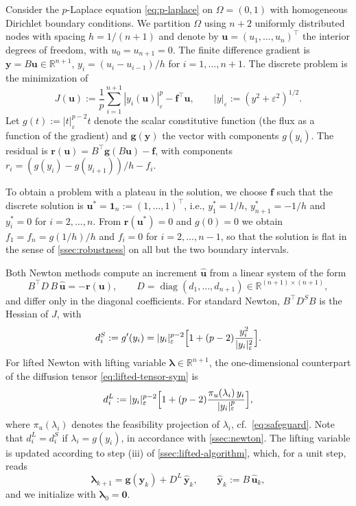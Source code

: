 \documentclass[11pt,pdflatex,sn-mathphys-num]{sn-jnl}
\theoremstyle{thmstyleone}%
\theoremstyle{thmstyletwo}%
\theoremstyle{thmstylethree}%
\newcommand{\bs}[1]{\ensuremath{\boldsymbol{#1}}}
\begin{document}
Consider the $p$-Laplace equation \eqref{eq:p-laplace} on $\Omega=(0,1)$ with homogeneous Dirichlet boundary conditions. We partition $\Omega$ using $n+2$ uniformly distributed nodes with spacing $h=1/(n+1)$ and denote by $\bs u=(u_1,\dots,u_n)^\top$ the interior degrees of freedom, with $u_0=u_{n+1}=0$. The finite difference gradient is $\bs y=B\bs u\in\mathbb R^{n+1}$, $y_i=(u_i-u_{i-1})/h$ for $i=1,\dots,n+1$. The discrete problem is the minimization of
\begin{equation*}
  J(\bs u):=\frac1p\sum_{i=1}^{n+1}|y_i(\bs u)|_\varepsilon^p-\bs f^{\!\top}\bs u,\qquad |y|_\varepsilon:=(y^2+\varepsilon^2)^{1/2}.
\end{equation*}
Let $g(t):=|t|_\varepsilon^{p-2}t$ denote the scalar constitutive function (the flux as a function of the gradient) and $\mathbf g(\bs y)$ the vector with components $g(y_i)$. The residual is $\bs r(\bs u)=B^\top\mathbf g(B\bs u)-\bs f$, with components
  $r_i=(g(y_i)-g(y_{i+1}))/{h}-f_i$.%


To obtain a problem with a plateau in the solution, we choose $\bs f$ such that the discrete solution is $\bs u^*=\bs 1_n:=(1,\dots,1)^\top$, i.e., $y_1^*=1/h$, $y_{n+1}^*=-1/h$ and $y_i^*=0$ for $i=2,\dots,n$. From $\bs r(\bs u^*)=0$ and $g(0)=0$ we obtain
  $f_1=f_n={g(1/h)}/{h}$ and $f_i=0$  for $i=2,\dots,n-1$,
so that the solution is flat in the sense of \cref{ssec:robustness} on all but the two boundary intervals.

Both Newton methods compute an increment $\hat{\bs u}$ from a linear system of the form
\begin{equation}\label{eq:appC-newton}
  B^\top D\,B\,\hat{\bs u}=-\bs r(\bs u),\qquad D=\operatorname{diag}(d_1,\dots,d_{n+1})\in\mathbb R^{(n+1)\times(n+1)},
\end{equation}
and differ only in the diagonal coefficients. For standard Newton, $B^\top D^S B$ is the Hessian of $J$, with
\begin{equation*}
  d_i^S:=g'(y_i)=|y_i|_\varepsilon^{p-2}\Bigl[1+(p-2)\frac{y_i^2}{|y_i|_\varepsilon^2}\Bigr].
\end{equation*}
For lifted Newton with lifting variable $\bs\lambda\in\mathbb R^{n+1}$, the one-dimensional counterpart of the diffusion tensor \eqref{eq:lifted-tensor-sym} is
\begin{equation*}
  d_i^L:=|y_i|_\varepsilon^{p-2}\Bigl[1+(p-2)\frac{\pi_u(\lambda_i)\,y_i}{|y_i|_\varepsilon^{p}}\Bigr],
\end{equation*}
where $\pi_u(\lambda_i)$ denotes the feasibility projection of $\lambda_i$, cf.~\eqref{eq:safeguard}. Note that $d_i^L=d_i^S$ if $\lambda_i=g(y_i)$, in accordance with \cref{ssec:newton}. The lifting variable is updated according to step (iii) of \cref{ssec:lifted-algorithm}, which, for a unit step, reads
\begin{equation}\label{eq:appC-lambda-update}
  \bs\lambda_{k+1}=\mathbf g(\bs y_k)+D^L\,\hat{\bs y}_k,\qquad \hat{\bs y}_k:=B\,\hat{\bs u}_k,
\end{equation}
and we initialize with $\bs\lambda_0=\bs 0$.
\end{document}
